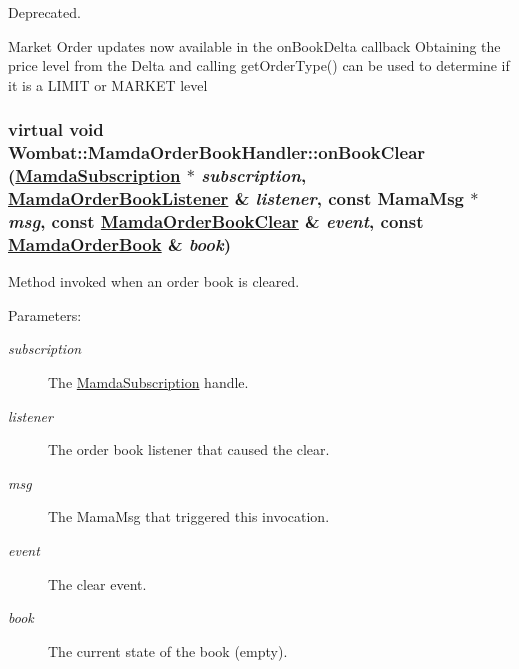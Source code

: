 Deprecated. 

Market Order updates now available in the on\-Book\-Delta callback Obtaining the price level from the Delta and calling get\-Order\-Type() can be used to determine if it is a LIMIT or MARKET level \hypertarget{classWombat_1_1MamdaOrderBookHandler_2035c156ec11491cb9b7af92a592f278}{
\subsubsection[onBookClear]{\setlength{\rightskip}{0pt plus 5cm}virtual void Wombat::Mamda\-Order\-Book\-Handler::on\-Book\-Clear (\hyperlink{classWombat_1_1MamdaSubscription}{Mamda\-Subscription} $\ast$ {\em subscription}, \hyperlink{classWombat_1_1MamdaOrderBookListener}{Mamda\-Order\-Book\-Listener} \& {\em listener}, const Mama\-Msg $\ast$ {\em msg}, const \hyperlink{classWombat_1_1MamdaOrderBookClear}{Mamda\-Order\-Book\-Clear} \& {\em event}, const \hyperlink{classWombat_1_1MamdaOrderBook}{Mamda\-Order\-Book} \& {\em book})}}
\label{classWombat_1_1MamdaOrderBookHandler_2035c156ec11491cb9b7af92a592f278}


Method invoked when an order book is cleared. 

\begin{Desc}
\item[Parameters:]
\begin{description}
\item[{\em subscription}]The \hyperlink{classWombat_1_1MamdaSubscription}{Mamda\-Subscription} handle. \item[{\em listener}]The order book listener that caused the clear. \item[{\em msg}]The Mama\-Msg that triggered this invocation. \item[{\em event}]The clear event. \item[{\em book}]The current state of the book (empty). \end{description}
\end{Desc}


